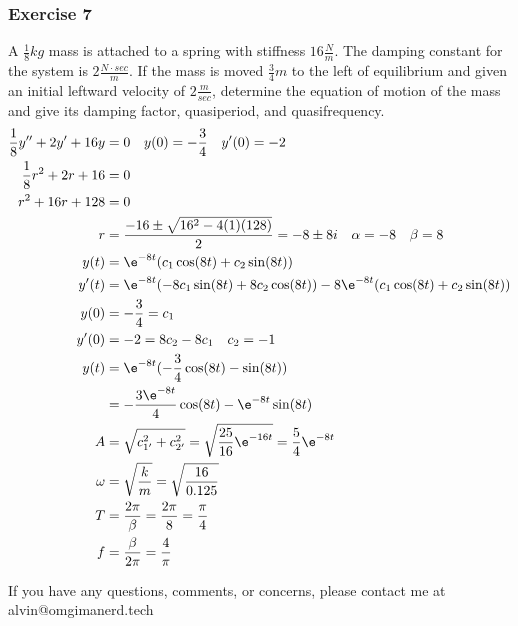 \documentclass{math}
\begin{document}
\subsubsection*{Exercise 7}
A \( \frac{1}{8}kg \) mass is attached to a spring with stiffness
\( 16\frac{N}{m} \). The damping constant for the system is
\( 2\frac{N\cdot sec}{m} \). If the mass is moved \( \frac{3}{4}m \) to the left
of equilibrium and given an initial leftward velocity of \( 2\frac{m}{sec} \),
determine the equation of motion of the mass and give its damping factor,
quasiperiod, and quasifrequency.
\begin{align*}
  \frac{1}{8}y''+2y'+16y &= 0 \quad y(0) = -\frac{3}{4} \quad y'(0) = -2 \\
  \frac{1}{8}r^2+2r+16 &= 0 \\
  r^2+16r+128 &= 0 \\
  r &= \frac{-16\pm\sqrt{16^2-4(1)(128)}}{2} = -8\pm8i \quad \alpha = -8 \quad
    \beta = 8 \\
  y(t) &= \e^{-8t}(c_1\cos(8t)+c_2\sin(8t)) \\
  y'(t) &= \e^{-8t}(-8c_1\sin(8t)+8c_2\cos(8t))-
    8\e^{-8t}(c_1\cos(8t)+c_2\sin(8t)) \\
  y(0) &= -\frac{3}{4} = c_1 \\
  y'(0) &= -2 = 8c_2-8c_1 \quad c_2 = -1 \\
  y(t) &= \e^{-8t}(-\frac{3}{4}\cos(8t)-\sin(8t)) \\
  &= -\frac{3\e^{-8t}}{4}\cos(8t)-\e^{-8t}\sin(8t) \\
  A &= \sqrt{c_{1'}^2+c_{2'}^2} = \sqrt{\frac{25}{16}\e^{-16t}} =
    \frac{5}{4}\e^{-8t} \\
  \omega &= \sqrt{\frac{k}{m}} = \sqrt{\frac{16}{0.125}} \\
  T &= \frac{2\pi}{\beta} = \frac{2\pi}{8} = \frac{\pi}{4} \\
  f &= \frac{\beta}{2\pi} = \frac{4}{\pi}
\end{align*}

\begin{center}
  If you have any questions, comments, or concerns, please contact me at
  alvin@omgimanerd.tech
\end{center}
\end{document}
